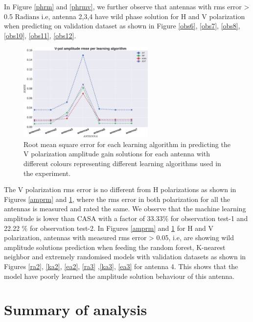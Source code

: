 In Figure \ref{phrm} and \ref{phrmv}, we further observe that antennas with rms error > 0.5 $\mathrm{Radians}$ i.e, antenna 2,3,4 have wild phase solution for H and V polarization when predicting on validation dataset as shown in Figure \ref{obs6}, \ref{obs7}, \ref{obs8},\ref{obs10}, \ref{obs11}, \ref{obs12}. 
\begin{figure}[H]
  \centering
    \includegraphics[width=0.6\textwidth]{images/Vpol-amp.eps}
    \caption{Root mean square error for each learning algorithm in predicting the V polarization amplitude gain solutions for each antenna with different colours representing different learning algorithms used in the experiment.}
  \label{amprmv}
 \end{figure} 

The V polarization rms error is no different from H polarizations as shown in Figures \ref{amprm} and \ref{amprmv}, where the rms error in both polarization for all the antennas is measured and rated the same. We observe that the machine learning amplitude is lower than CASA with a factor of 33.33$\%$ for observation test-1 and 22.22 $\%$ for observation test-2. In Figures \ref{amprm} and \ref{amprmv} for H and V polarization, antennas with measured rms error > 0.05, i.e, are showing wild amplitude solutions prediction when feeding the random forest, K-nearest neighbor and extremely randomised models with validation datasets as shown in Figures  \ref{ra2}, \ref{ka2}, \ref{ea2}, \ref{ra3} ,\ref{ka3}, \ref{ea3} for antenna 4. This shows that the model have poorly learned the amplitude solution behaviour of this antenna. 

\section{Summary of analysis}

